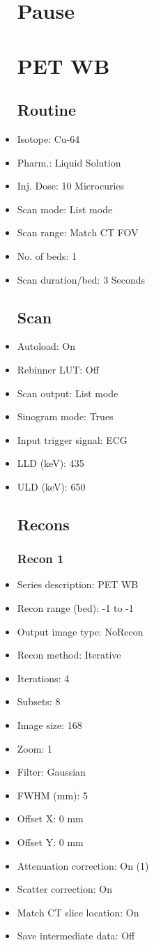 \documentclass[12pt]{article}
\begin{document}
\begin{itemize}[noitemsep]
\section{Pause}
\section{PET WB}\subsection{Routine}
\item Isotope: Cu-64
\item Pharm.: Liquid Solution
\item Inj. Dose: 10 Microcuries
\item Scan mode: List mode
\item Scan range: Match CT FOV
\item No. of beds: 1
\item Scan duration/bed: 3 Seconds
\subsection{Scan}
\item Autoload: On
\item Rebinner LUT: Off
\item Scan output: List mode
\item Sinogram mode: Trues
\item Input trigger signal: ECG
\item LLD (keV): 435
\item ULD (keV): 650
\subsection{Recons}
\subsubsection{Recon 1}
\item Series description: PET WB 
\item Recon range (bed): -1 to -1
\item Output image type: NoRecon
\item Recon method: Iterative
\item Iterations: 4
\item Subsets: 8
\item Image size: 168
\item Zoom: 1
\item Filter: Gaussian
\item FWHM (mm): 5
\item Offset X: 0 mm
\item Offset Y: 0 mm
\item Attenuation correction: On (1)
\item Scatter correction: On
\item Match CT slice location: On
\item Save intermediate data: Off

\end{itemize}
\end{document}
